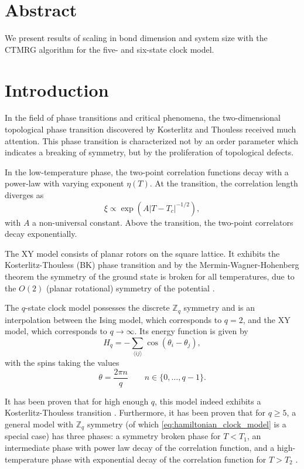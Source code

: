 \section{Abstract}
We present results of scaling in bond dimension and system size with the CTMRG algorithm for the five- and six-state
clock model.

\section{Introduction}
In the field of phase transitions and critical phenomena, the two-dimensional topological phase transition discovered by
Kosterlitz and Thouless \cite{kosterlitz1973ordering, kosterlitz1974critical} received much attention. This phase
transition is characterized not by an order parameter which indicates a breaking of symmetry, but by the proliferation
of topological defects.

In the low-temperature phase, the two-point correlation functions decay with a power-law with varying
exponent $\eta(T)$. At the transition, the correlation length diverges as
\begin{equation}
  \xi \propto \exp(A |T - T_c|^{-1/2}),
\end{equation}
with $A$ a non-universal constant. Above the transition, the two-point correlators decay exponentially.

The XY model consists of planar rotors on the square lattice. It exhibits the Kosterlitz-Thouless (BK) phase transition
and by the Mermin-Wagner-Hohenberg theorem the symmetry of the ground state is broken for all temperatures, due to
the $O(2)$ (planar rotational) symmetry of the potential \cite{mermin1966absence, hohenberg1967existence}.

The $q$-state clock model possesses the discrete $\mathbb{Z}_q$ symmetry and is an interpolation between the Ising
model, which corresponds to $q = 2$, and the XY model, which corresponds to $q \to \infty$. Its energy function is given
by
\begin{equation}\label{eq:hamiltonian_clock_model}
  H_q = -\sum_{\langle i j \rangle} \cos(\theta_i - \theta_j),
\end{equation}
with the spins taking the values
\begin{equation}
  \theta = \frac{2 \pi n}{q} \qquad n \in \{ 0, \dots, q-1 \}.
\end{equation}

It has been proven that for high enough $q$, this model indeed exhibits a Kosterlitz-Thouless transition
\cite{frohlich1981kosterlitz}. Furthermore, it has been proven that for $q \geq 5$, a general model with $\mathbb{Z}_q$
symmetry (of which \autoref{eq:hamiltonian_clock_model} is a special case) has three phases: a symmetry broken phase for
$T < T_1$, an intermediate phase with power law decay of the correlation function, and a high-temperature phase with
exponential decay of the correlation function for $T > T_2$ \cite{cardy1980general}.

